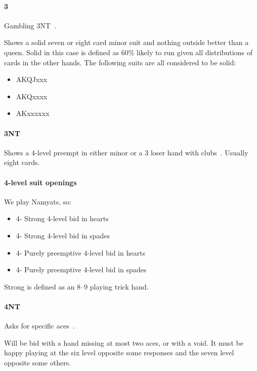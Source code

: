 \documentclass[a4paper,14pt]{extarticle}
\begin{document}
\paragraph{3\spades}

Gambling 3NT~. 

Shows a solid seven or eight card minor suit and nothing outside better than a
queen.  Solid in this case is defined as 60\% likely to run given all
distributions of cards in the other hands. The following suits are all
considered to be solid:

\begin{itemize}
\item AKQJxxx
\item AKQxxxx
\item AKxxxxxx
\end{itemize}

\paragraph{3NT}

Shows a 4-level preempt in either minor or a 3 loser hand with
clubs~. Usually eight cards. 

\paragraph{4-level suit openings}

We play Namyats, so:

\begin{itemize}
\item 4\clubs - Strong 4-level bid in hearts~
\item 4\diamonds - Strong 4-level bid in spades~
\item 4\hearts - Purely preemptive 4-level bid in hearts
\item 4\spades - Purely preemptive 4-level bid in spades
\end{itemize}

Strong is defined as an 8--9 playing trick hand.

\paragraph{4NT}

Asks for specific aces~.

Will be bid with a hand missing at most two aces, or with a void. It must be happy playing at the six level opposite some responses and the seven level opposite some others.
\end{document}
